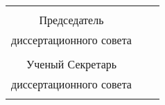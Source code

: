 \begin{center}
	\begin{tabular}[c]{c m{4cm} l}
		&            &                     \\
		Председатель       &            &                     \\
		диссертационного совета & \hrulefill & \dcHeadFullFIO      \\
		\dcHeadRegalia      &            &                     \\
		Ученый Секретарь     &            &                     \\
		диссертационного совета & \hrulefill & \dcSecretaryFullFIO \\
		\dcSecretaryRegalia   &            &
	\end{tabular}
\end{center}


\clearpage